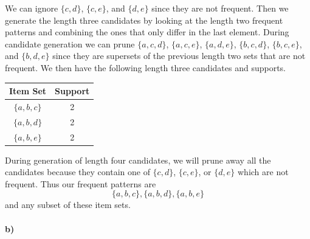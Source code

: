 \documentclass[12pt]{article}
\begin{document}
We can ignore \(\{c,d\}\), \(\{c,e\}\), and \(\{d,e\}\) since they are not frequent. Then we generate the length three
candidates by looking at the length two frequent patterns and combining the ones that only differ in the last element.
During candidate generation we can prune \(\{a,c,d\}\), \(\{a,c,e\}\), \(\{a,d,e\}\), \(\{b,c,d\}\), \(\{b,c,e\}\),
and \(\{b,d,e\}\) since they are supersets of the previous length two sets that are not frequent. We
then have the following length three candidates and supports.
\begin{center}
    \begin{tabular}{c|c}
        Item Set & Support \\
        \hline
        \(\{a,b,c\}\) & 2\\
        \(\{a,b,d\}\) & 2\\
        \(\{a,b,e\}\) & 2
    \end{tabular}
\end{center}
During generation of length four candidates, we will prune away all the candidates because they contain one of \(\{c,d\}\),
\(\{c,e\}\), or \(\{d,e\}\) which are not frequent. Thus our frequent patterns are
\[\{a,b,c\}, \{a,b,d\}, \{a,b,e\}\]
and any subset of these item sets.

\paragraph{b)}
\end{document}
